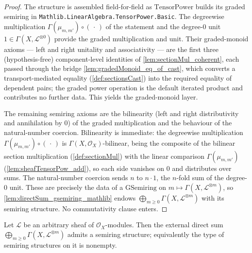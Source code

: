 \begin{proof}
  \leanok
  The structure is assembled field-for-field as \(\mathrm{TensorPower}\) builds its
  graded semiring in \texttt{Mathlib.LinearAlgebra.TensorPower.Basic}. The
  degreewise multiplication \(\Gamma(\mu_{m,m'}) \circ (\,\cdot\,)\) of the
  statement and the degree-\(0\) unit \(1 \in \Gamma(X, \mathcal{L}^{\otimes 0})\)
  provide the graded multiplication and unit. Their graded-monoid axioms --- left
  and right unitality and associativity --- are the first three (hypothesis-free)
  component-level identities of \cref{lem:sectionMul_coherent}, each passed through
  the bridge \cref{lem:gradedMonoid_eq_of_cast}, which converts a
  transport-mediated equality (\cref{def:sectionsCast}) into the required equality
  of dependent pairs; the graded power operation is the default iterated product
  and contributes no further data. This yields the graded-monoid layer.

  The remaining semiring axioms are the bilinearity (left and right distributivity
  and annihilation by \(0\)) of the graded multiplication and the behaviour of the
  natural-number coercion. Bilinearity is immediate: the degreewise multiplication
  \(\Gamma(\mu_{m,m'}) \circ (\,\cdot\,)\) is \(\Gamma(X,\mathcal{O}_X)\)-bilinear,
  being the composite of the bilinear section multiplication (\cref{def:sectionMul})
  with the linear comparison \(\Gamma(\mu_{m,m'})\)
  (\cref{lem:sheafTensorPow_add}), so each side vanishes on \(0\) and distributes
  over sums. The natural-number coercion sends \(n\) to \(n \cdot 1\), the
  \(n\)-fold sum of the degree-\(0\) unit. These are precisely the data of a
  \(\mathrm{GSemiring}\) on \(m \mapsto \Gamma(X, \mathcal{L}^{\otimes m})\), so
  \cref{lem:directSum_gsemiring_mathlib} endows
  \(\bigoplus_{m \ge 0} \Gamma(X, \mathcal{L}^{\otimes m})\) with its semiring
  structure. No commutativity clause enters.
\end{proof}

\begin{lemma}
  \label{lem:sectionGradedRing_semiring_nonempty}
  Let \(\mathcal{L}\) be an arbitrary sheaf of \(\mathcal{O}_X\)-modules. Then the
  external direct sum \(\bigoplus_{m \ge 0} \Gamma(X,\mathcal{L}^{\otimes m})\)
  admits a semiring structure; equivalently the type of semiring structures on it
  is nonempty.
\end{lemma}

